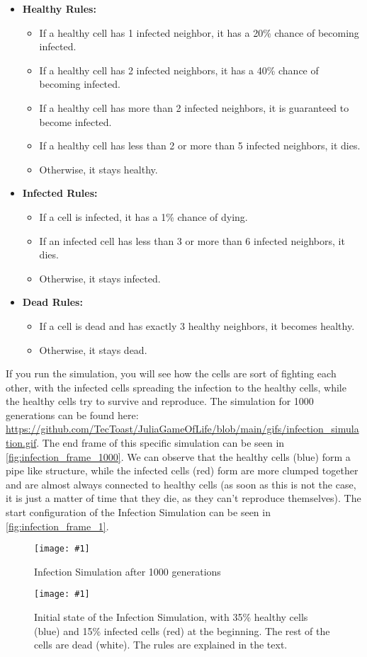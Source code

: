 \documentclass[a4paper,12pt]{llncs}
\numberwithin{equation}{section}
\newcommand{\imagewithwidth}[5]{
  \begin{figure}[htbp]%
    \begin{center}%
      \texttt{[image: \#1]}%
      \caption[#5]{#4}%
      \label{#3}%
    \end{center}%
  \end{figure}
}
\begin{document}
\begin{itemize}
  \item \textbf{Healthy Rules:}
        \begin{itemize}
          \item If a healthy cell has 1 infected neighbor, it has a 20\% chance of becoming infected.
          \item If a healthy cell has 2 infected neighbors, it has a 40\% chance of becoming infected.
          \item If a healthy cell has more than 2 infected neighbors, it is guaranteed to become infected.
          \item If a healthy cell has less than 2 or more than 5 infected neighbors, it dies.
          \item Otherwise, it stays healthy.
        \end{itemize}
  \item \textbf{Infected Rules:}
        \begin{itemize}
          \item If a cell is infected, it has a 1\% chance of dying.
          \item If an infected cell has less than 3 or more than 6 infected neighbors, it dies.
          \item Otherwise, it stays infected.
        \end{itemize}
  \item \textbf{Dead Rules:}
        \begin{itemize}
          \item If a cell is dead and has exactly 3 healthy neighbors, it becomes healthy.
          \item Otherwise, it stays dead.
        \end{itemize}
\end{itemize}
If you run the simulation, you will see how the cells are sort of fighting each other, with the infected cells spreading the infection to the healthy cells, while the healthy cells try to survive and reproduce.
The simulation for 1000 generations can be found here: \url{https://github.com/TecToast/JuliaGameOfLife/blob/main/gifs/infection_simulation.gif}. The end frame of this specific simulation can be seen in \autoref{fig:infection_frame_1000}.
We can observe that the healthy cells (blue) form a pipe like structure, while the infected cells (red) form are more clumped together and are almost always connected to healthy cells (as soon as this is not the case, it is just a matter of time that they die, as they can't reproduce themselves).
The start configuration of the Infection Simulation can be seen in \autoref{fig:infection_frame_1}.
\imagewithwidth{figures/infection_frame_1000}{0.8\textwidth}{fig:infection_frame_1000}{Infection Simulation after 1000 generations}{}
\imagewithwidth{figures/infection_frame_1}{0.8\textwidth}{fig:infection_frame_1}{Initial state of the Infection Simulation, with 35\% healthy cells (blue) and 15\% infected cells (red) at the beginning. The rest of the cells are dead (white). The rules are explained in the text.}{}
\end{document}
